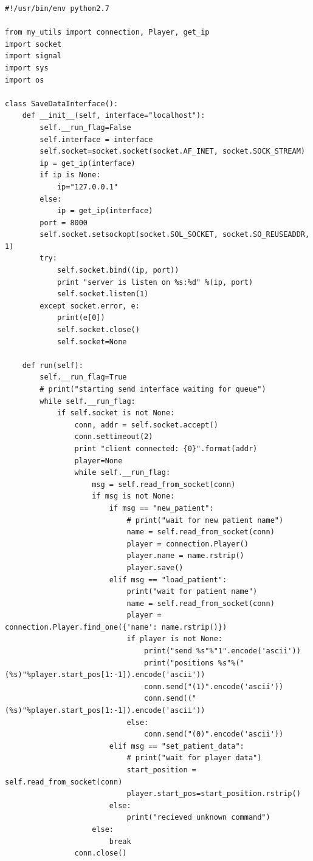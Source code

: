 \begin{lstlisting}
#!/usr/bin/env python2.7

from my_utils import connection, Player, get_ip
import socket
import signal
import sys
import os

class SaveDataInterface():
    def __init__(self, interface="localhost"):
        self.__run_flag=False
        self.interface = interface
        self.socket=socket.socket(socket.AF_INET, socket.SOCK_STREAM)
        ip = get_ip(interface)
        if ip is None:
            ip="127.0.0.1"
        else:
            ip = get_ip(interface)
        port = 8000
        self.socket.setsockopt(socket.SOL_SOCKET, socket.SO_REUSEADDR, 1)
        try:
            self.socket.bind((ip, port))
            print "server is listen on %s:%d" %(ip, port)
            self.socket.listen(1)
        except socket.error, e:
            print(e[0])
            self.socket.close()
            self.socket=None

    def run(self):
        self.__run_flag=True
        # print("starting send interface waiting for queue")
        while self.__run_flag:
            if self.socket is not None:
                conn, addr = self.socket.accept()
                conn.settimeout(2)
                print "client connected: {0}".format(addr)
                player=None
                while self.__run_flag:
                    msg = self.read_from_socket(conn)
                    if msg is not None:
                        if msg == "new_patient":
                            # print("wait for new patient name")
                            name = self.read_from_socket(conn)
                            player = connection.Player()
                            player.name = name.rstrip()
                            player.save()
                        elif msg == "load_patient":
                            print("wait for patient name")
                            name = self.read_from_socket(conn)
                            player = connection.Player.find_one({'name': name.rstrip()})
                            if player is not None:
                                print("send %s"%"1".encode('ascii'))
                                print("positions %s"%("(%s)"%player.start_pos[1:-1]).encode('ascii'))
                                conn.send("(1)".encode('ascii'))
                                conn.send(("(%s)"%player.start_pos[1:-1]).encode('ascii'))
                            else:
                                conn.send("(0)".encode('ascii'))
                        elif msg == "set_patient_data":
                            # print("wait for player data")
                            start_position = self.read_from_socket(conn)
                            player.start_pos=start_position.rstrip()
                        else:
                            print("recieved unknown command")
                    else:   
                        break
                conn.close()


\end{lstlisting}
